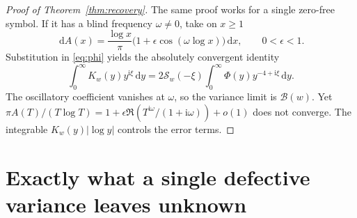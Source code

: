 \documentclass[11pt]{article}
\theoremstyle{definition}\newtheorem{definition}[theorem]{Definition}
\theoremstyle{remark}\newtheorem{remark}[theorem]{Remark}
\newcommand{\dd}{\,\mathrm d}\newcommand{\ii}{\mathrm i}
\newcommand{\Sym}{\mathcal S}
\newcommand{\B}{\mathcal B}
\begin{document}
\begin{proof}[Proof of Theorem~\ref{thm:recovery}]
The same proof works for a single zero-free symbol. If it has a blind
frequency $\omega\ne0$, take on $x\ge1$
\begin{equation}\label{eq:counterdensity}
 \dd A(x)=\frac{\log x}{\pi}\bigl(1+\epsilon\cos(\omega\log x)\bigr)\dd x,
 \qquad 0<\epsilon<1.
\end{equation}
Substitution in \eqref{eq:phi} yields the absolutely convergent identity
\begin{equation}\label{eq:mellin}
 \int_0^\infty K_w(y)y^{\ii\xi}\dd y
 =2\Sym_w(-\xi)\int_0^\infty\Phi(y)y^{-4+\ii\xi}\dd y.
\end{equation}
The oscillatory coefficient vanishes at $\omega$, so the variance limit
is $\B(w)$. Yet
$\pi A(T)/(T\log T)=1+\epsilon\Re(T^{\ii\omega}/(1+\ii\omega))+o(1)$
does not converge. The integrable $K_w(y)|\log y|$ controls the error terms.
\end{proof}

\section{Exactly what a single defective variance leaves unknown}
\end{document}

